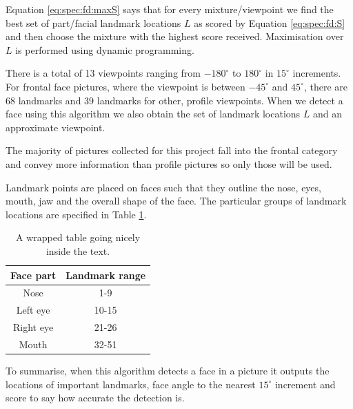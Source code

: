 Equation \ref{eq:spec:fd:maxS} says that for every mixture/viewpoint we find
the best set of part/facial landmark locations $L$ as scored by Equation
\ref{eq:spec:fd:S} and then choose the mixture with the highest score received.
Maximisation over $L$ is performed using dynamic programming.


There is a total of 13 viewpoints ranging from $-180^\circ$ to $180^\circ$ in
$15^\circ$ increments. For frontal face pictures, where the viewpoint is
between $-45^\circ$ and $45^\circ$, there are 68 landmarks and 39 landmarks for
other, profile viewpoints. When we detect a face using this algorithm we also
obtain the set of landmark locations $L$ and an approximate viewpoint.

The majority of pictures collected for this project fall into the frontal
category and convey more information than profile pictures so only those will
be used.

Landmark points are placed on faces such that they outline the nose, eyes,
mouth, jaw and the overall shape of the face. The particular groups of landmark
locations are specified in Table \ref{table:spec:fd:landmarks}.

\begin{table}
    \begin{tabular}{cc}\\\toprule  
        Face part & Landmark range \\\midrule
        Nose      & 1-9 \\  \midrule
        Left eye  & 10-15 \\  \midrule
        Right eye & 21-26\\  \midrule
        Mouth     & 32-51 \\  \bottomrule
    \end{tabular}
    \caption{A wrapped table going nicely inside the text.}
    \label{table:spec:fd:landmarks}
\end{table} 

To summarise, when this algorithm detects a face in a picture it outputs the 
locations of important landmarks, face angle to the nearest $15^\circ$
increment and score to say how accurate the detection is.

